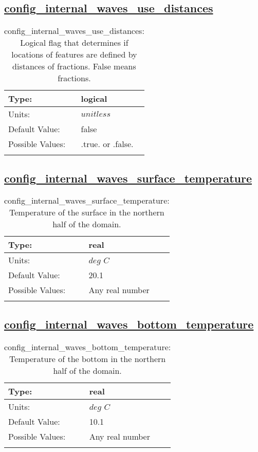 \subsection[config\_internal\_waves\_use\_distances]{\hyperref[sec:nm_tab_internal_waves]{config\_internal\_waves\_use\_distances}}
\label{subsec:nm_sec_config_internal_waves_use_distances}
\begin{center}
\begin{longtable}{| p{2.0in} || p{4.0in} |}
    \hline
    Type: & logical \\
    \hline
    Units: & $unitless$ \\
    \hline
    Default Value: & false \\
    \hline
    Possible Values: & .true. or .false. \\
    \hline
    \caption{config\_internal\_waves\_use\_distances: Logical flag that determines if locations of features are defined by distances of fractions. False means fractions.}
\end{longtable}
\end{center}
\subsection[config\_internal\_waves\_surface\_temperature]{\hyperref[sec:nm_tab_internal_waves]{config\_internal\_waves\_surface\_temperature}}
\label{subsec:nm_sec_config_internal_waves_surface_temperature}
\begin{center}
\begin{longtable}{| p{2.0in} || p{4.0in} |}
    \hline
    Type: & real \\
    \hline
    Units: & $deg$ $C$ \\
    \hline
    Default Value: & 20.1 \\
    \hline
    Possible Values: & Any real number \\
    \hline
    \caption{config\_internal\_waves\_surface\_temperature: Temperature of the surface in the northern half of the domain.}
\end{longtable}
\end{center}
\subsection[config\_internal\_waves\_bottom\_temperature]{\hyperref[sec:nm_tab_internal_waves]{config\_internal\_waves\_bottom\_temperature}}
\label{subsec:nm_sec_config_internal_waves_bottom_temperature}
\begin{center}
\begin{longtable}{| p{2.0in} || p{4.0in} |}
    \hline
    Type: & real \\
    \hline
    Units: & $deg$ $C$ \\
    \hline
    Default Value: & 10.1 \\
    \hline
    Possible Values: & Any real number \\
    \hline
    \caption{config\_internal\_waves\_bottom\_temperature: Temperature of the bottom in the northern half of the domain.}
\end{longtable}
\end{center}
